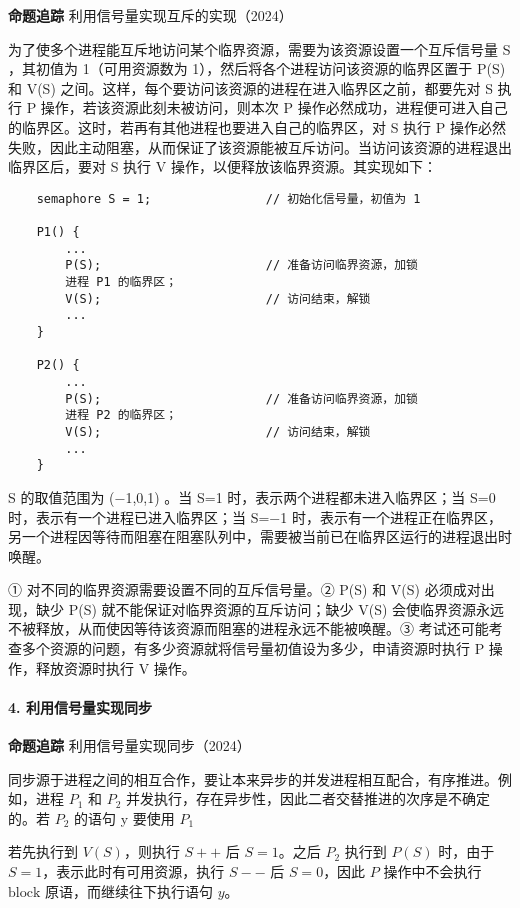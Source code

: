 \documentclass{ctexbook}
\begin{document}
	\textbf{命题追踪} 利用信号量实现互斥的实现（2024）
	
	为了使多个进程能互斥地访问某个临界资源，需要为该资源设置一个互斥信号量 S ，其初值为 1（可用资源数为 1），然后将各个进程访问该资源的临界区置于 P(S) 和 V(S) 之间。这样，每个要访问该资源的进程在进入临界区之前，都要先对 S 执行 P 操作，若该资源此刻未被访问，则本次 P 操作必然成功，进程便可进入自己的临界区。这时，若再有其他进程也要进入自己的临界区，对 S 执行 P 操作必然失败，因此主动阻塞，从而保证了该资源能被互斥访问。当访问该资源的进程退出临界区后，要对 S 执行 V 操作，以便释放该临界资源。其实现如下：
	\begin{lstlisting}
	semaphore S = 1;                // 初始化信号量，初值为 1
	
	P1() {
		...
		P(S);                       // 准备访问临界资源，加锁
		进程 P1 的临界区；
		V(S);                       // 访问结束，解锁
		...
	}
	
	P2() {
		...
		P(S);                       // 准备访问临界资源，加锁
		进程 P2 的临界区；
		V(S);                       // 访问结束，解锁
		...
	}
\end{lstlisting}

S 的取值范围为 (−1,0,1) 。当 S=1 时，表示两个进程都未进入临界区；当 S=0 时，表示有一个进程已进入临界区；当 S=−1 时，表示有一个进程正在临界区，另一个进程因等待而阻塞在阻塞队列中，需要被当前已在临界区运行的进程退出时唤醒。

\begin{tcolorbox}[colback=gray!10, colframe=black!50, title=注意]
	① 对不同的临界资源需要设置不同的互斥信号量。② P(S) 和 V(S) 必须成对出现，缺少 P(S) 就不能保证对临界资源的互斥访问；缺少 V(S) 会使临界资源永远不被释放，从而使因等待该资源而阻塞的进程永远不能被唤醒。③ 考试还可能考查多个资源的问题，有多少资源就将信号量初值设为多少，申请资源时执行 P 操作，释放资源时执行 V 操作。
\end{tcolorbox}

\paragraph{4. 利用信号量实现同步}

\textbf{命题追踪} 利用信号量实现同步（2024）

同步源于进程之间的相互合作，要让本来异步的并发进程相互配合，有序推进。例如，进程 $P_1$
和 $P_2$
并发执行，存在异步性，因此二者交替推进的次序是不确定的。若 $P_2$
的语句 y 要使用 $P_1$

若先执行到 $V(S)$，则执行 $S++$ 后 $S=1$。之后 $P_2$ 执行到 $P(S)$ 时，由于 $S=1$，表示此时有可用资源，执行 $S--$ 后 $S=0$，因此 $P$ 操作中不会执行 $\text{block}$ 原语，而继续往下执行语句 $y$。
\end{document}
